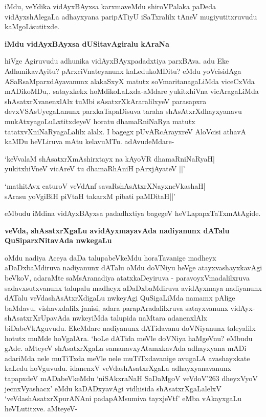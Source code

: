 iMdu, veYdika vidAyxBAyxsa karxmaveMdu shiroVPalaka paDeda vidAyxshAlegaLa adhayxyana paripATiyU iSaTxralilx tAneV mugiyutitxruvudu kaMgoLisutitxde.

\textbf{iMdu vidAyxBAyxsa dUSitavAgiralu kAraNa}

hiVge Agiruvudu adhunika vidAyxBAyxpadadxtiya parxBAva. adu Eke AdhunikavAyitu? pArxciVnateyanunx kaLedukoMDitu? eMdu yoVcisidAga ASaRsaMparxdAyavanunx alakaSxyX matutx soVmaritanagaLiMda viceCxVda mADikoMDu,. satayxkekx hoMdikoLaLxda-aMdare yukitxhiVna vicAragaLiMda shAsatxrXvanenxlAlx tuMbi sAsatxrXkAraralilxyeV parasapxra devxVSAsUyegaLanunx parxkaTapaDisuva taraha shAsAtxrXdhayxyanavu mukAtxyagoLuLxtitxdeyeV horatu dhamaRniNaRya matutx tatatxvXniNaRyagaLalilx  alalx. I bagegx pUvARcArayxreV AloVcisi athavA kaMDu heVLiruva mAtu kelavuMTu. adAvudeMdare-

\begin{shloka}
`keVvalaM shAsatxrXmAshirxtayx na kAyoVR dhamaRniNaRyaH|\\
yukitxhiVneV vicAreV tu dhamaRhAniH pArxjAyateV ||'
\end{shloka}
\begin{shloka}
`mathitAvx caturoV veVdAnf savaRshAsAtxrXNayxneVkashaH|\\
sArasu yoVgiBiH piVtaH takarxM pibati paMDitaH||'
\end{shloka}
eMbudu iMdina vidAyxBAyxsa padadhxtiya bagegeV heVLapapxTaTxmAtAgide.

\textbf{veVda, shAsatxrXgaLu avidAyxmayavAda nadiyanunx dATalu QuSiparxNitavAda nwkegaLu}

oMdu nadiya Aceya daDa talupabeVkeMdu horaTavanige madheyx aDaDxbaMdiruva nadiyanunx dATalu oMdu doVNiyu heVge atayxvashayxkavAgi beVkoV, adaraMte saMsAranadiya atatxkaDeyiruva - paravoyxVmadalilxruva sadavxsutxvanunx talupalu madheyx aDaDxbaMdiruva avidAyxmaya nadiyanunx dATalu veVdashAsAtxrXdigaLu nwkeyAgi QuSigaLiMda namamx pAlige baMdavu. vishavxdalilx janisi, adara parapAradalilxruva satayxvanunx vidAyx-shAsatxrXrUpavAda nwkeyiMda talupida naMtara adanenxlAlx biDabeVkAguvudu. EkeMdare nadiyanunx dATidavanu doVNiyanunx taleyalilx hotutx muMde hoVgalAra. `hoLe dATida meVle doVNiya haMgeVnu? eMbudu gAde. aMteyeV shAsatxrXgaLa samanavxyAtamxkavAda adhayxyana mADi adariMda nele muTiTxda meVle nele muTiTxdavanige avugaLA avashayxkate kaLedu hoVguvudu. idanenxV veVdashAsatxrXgaLa adhayxyanavanunx tapapxdeV mADabeVkeMdu `niSAkxraNaH SaDaMgoV veVdoV\char'263 dheyxVyoV jecnxVyashacx' eMdu kaDADxyavAgi vidhisida shAsatxrXgaLalelxV  `veVdashAsatxrXpurANAni padapAMsumiva tayxjeVtf' eMba vAkayxgaLu heVLutitxve. aMteyeV-

